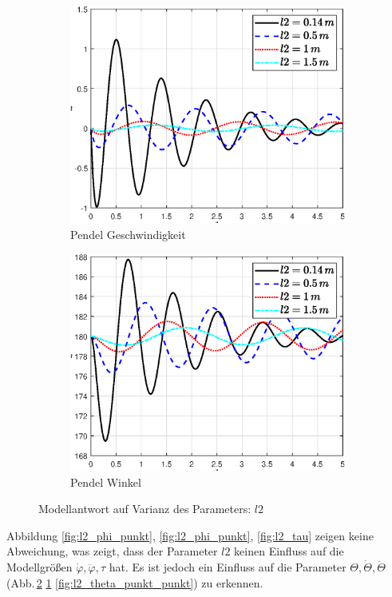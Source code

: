 \begin{figure}
    \begin{subfigure}[b]{0.49\linewidth}
        \includegraphics[width=\linewidth]{Bilder/5_sensi/fig/l2/theta_punkt.eps}
        \caption{Pendel Geschwindigkeit}
        \label{fig:l2_theta_punkt}      
    \end{subfigure}
    \begin{subfigure}[b]{0.49\linewidth}
        \includegraphics[width=\linewidth]{Bilder/5_sensi/fig/l2/theta.eps}
        \caption{Pendel Winkel}
        \label{fig:l2_theta}
    \end{subfigure}
        \caption{Modellantwort auf Varianz des Parameters: $l2$}
        \label{fig:l2}
\end{figure}
Abbildung \ref{fig:l2_phi_punkt}, \ref{fig:l2_phi_punkt}, \ref{fig:l2_tau} zeigen keine Abweichung, was zeigt, dass der Parameter $l2$ keinen Einfluss auf die Modellgrößen $\dot\varphi,\ddot\varphi,\tau$ hat.
Es ist jedoch ein Einfluss auf die Parameter $\Theta,\dot\Theta,\ddot\Theta$ (Abb.\,\ref{fig:l2_theta} \ref{fig:l2_theta_punkt} \ref{fig:l2_theta_punkt_punkt}) zu erkennen. 

